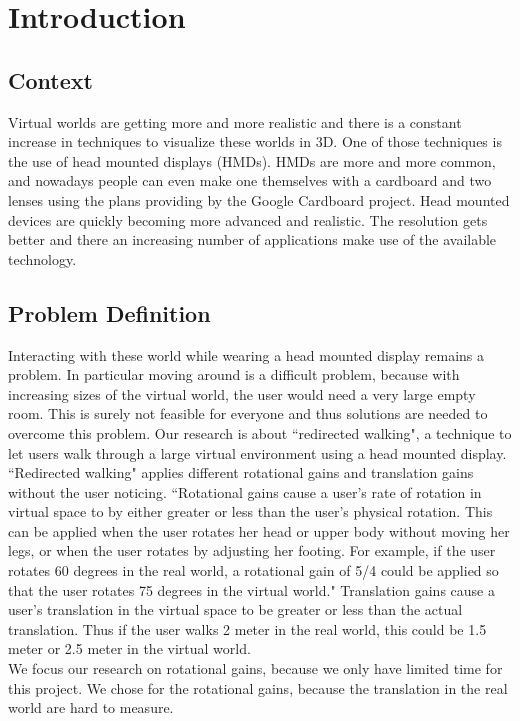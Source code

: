 \section{Introduction}
\subsection{Context}\label{sec:context}
Virtual worlds are getting more and more realistic and there is a constant increase in techniques to visualize these worlds in 3D.
One of those techniques is the use of head mounted displays (HMDs).
HMDs are more and more common, and nowadays people can even make one themselves with a cardboard and two lenses using the plans providing by the Google Cardboard project.
Head mounted devices are quickly becoming more advanced and realistic.
The resolution gets better and there an increasing number of applications make use of the available technology.

\subsection{Problem Definition}\label{sec:problem}
Interacting with these world while wearing a head mounted display remains a problem.
In particular moving around is a difficult problem, because with increasing sizes of the virtual world, the user would need a very large empty room.
This is surely not feasible for everyone and thus solutions are needed to overcome this problem.
Our research is about ``redirected walking", a technique to let users walk through a large virtual environment using a head mounted display.
``Redirected walking" applies different rotational gains and translation gains without the user noticing.
``Rotational gains cause a user's rate of rotation in virtual space to by either greater or less than
the user's physical rotation.
This can be applied when the user rotates her head or upper body without moving her legs, or when the user rotates by adjusting her footing.
For example, if the user rotates 60 degrees in the real world, a rotational gain of 5/4 could be applied so that the user rotates 75 degrees in the virtual world."\cite{jwalker}
Translation gains cause a user's translation in the virtual space to be greater or less than the actual translation.
Thus if the user walks 2 meter in the real world, this could be 1.5 meter or 2.5 meter in the virtual world. \\
We focus our research on rotational gains, because we only have limited time for this project.
We chose for the rotational gains, because the translation in the real world are hard to measure.

